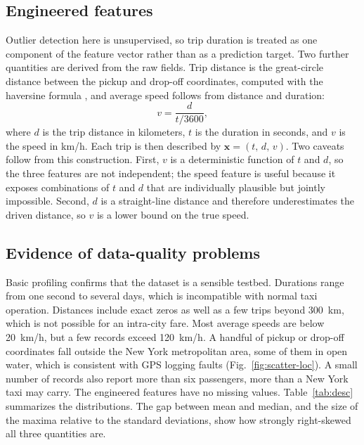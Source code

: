 \documentclass{ieeeaccess}
\begin{document}
\subsection{Engineered features}
Outlier detection here is unsupervised, so trip duration is treated as one component of the feature vector rather than as a prediction target. Two further quantities are derived from the raw fields. Trip distance is the great-circle distance between the pickup and drop-off coordinates, computed with the haversine formula \cite{sinnott1984}, and average speed follows from distance and duration:
\begin{equation}
v = \frac{d}{t/3600},
\label{eq:speed}
\end{equation}
where $d$ is the trip distance in kilometers, $t$ is the duration in seconds, and $v$ is the speed in km/h. Each trip is then described by $\mathbf{x}=(t,\,d,\,v)$. Two caveats follow from this construction. First, $v$ is a deterministic function of $t$ and $d$, so the three features are not independent; the speed feature is useful because it exposes combinations of $t$ and $d$ that are individually plausible but jointly impossible. Second, $d$ is a straight-line distance and therefore underestimates the driven distance, so $v$ is a lower bound on the true speed.

\subsection{Evidence of data-quality problems}
Basic profiling confirms that the dataset is a sensible testbed. Durations range from one second to several days, which is incompatible with normal taxi operation. Distances include exact zeros as well as a few trips beyond 300~km, which is not possible for an intra-city fare. Most average speeds are below 20~km/h, but a few records exceed 120~km/h. A handful of pickup or drop-off coordinates fall outside the New York metropolitan area, some of them in open water, which is consistent with GPS logging faults (Fig.~\ref{fig:scatter-loc}). A small number of records also report more than six passengers, more than a New York taxi may carry. The engineered features have no missing values. Table~\ref{tab:desc} summarizes the distributions. The gap between mean and median, and the size of the maxima relative to the standard deviations, show how strongly right-skewed all three quantities are.
\end{document}
